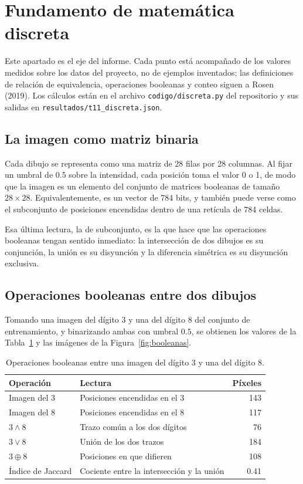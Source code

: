 \documentclass[12pt,letterpaper]{article}
\begin{document}
\section{Fundamento de matemática discreta}
\label{sec:discreta}

Este apartado es el eje del informe. Cada punto está acompañado de los valores
medidos sobre los datos del proyecto, no de ejemplos inventados; las definiciones
de relación de equivalencia, operaciones booleanas y conteo siguen a
Rosen (2019). Los cálculos están en el archivo \texttt{codigo/discreta.py} del
repositorio y sus salidas en \texttt{resultados/t11\_discreta.json}.

\subsection{La imagen como matriz binaria}

Cada dibujo se representa como una matriz de 28 filas por 28 columnas. Al fijar un
umbral de $0.5$ sobre la intensidad, cada posición toma el valor 0 o 1, de modo
que la imagen es un elemento del conjunto de matrices booleanas de tamaño
$28\times28$. Equivalentemente, es un vector de 784 bits, y también puede verse
como el subconjunto de posiciones encendidas dentro de una retícula de 784 celdas.

Esa última lectura, la de subconjunto, es la que hace que las operaciones
booleanas tengan sentido inmediato: la intersección de dos dibujos es su
conjunción, la unión es su disyunción y la diferencia simétrica es su disyunción
exclusiva.

\subsection{Operaciones booleanas entre dos dibujos}

Tomando una imagen del dígito 3 y una del dígito 8 del conjunto de entrenamiento,
y binarizando ambas con umbral $0.5$, se obtienen los valores de la
Tabla~\ref{tab:booleanas} y las imágenes de la Figura~\ref{fig:booleanas}.

\begin{table}[htbp]
\centering
\caption{Operaciones booleanas entre una imagen del dígito 3 y una del dígito 8.}
\label{tab:booleanas}
\begin{tabular}{llr}
\toprule
\textbf{Operación} & \textbf{Lectura} & \textbf{Píxeles} \\
\midrule
Imagen del 3 & Posiciones encendidas en el 3 & 143 \\
Imagen del 8 & Posiciones encendidas en el 8 & 117 \\
$3 \wedge 8$ & Trazo común a los dos dígitos & 76 \\
$3 \vee 8$ & Unión de los dos trazos & 184 \\
$3 \oplus 8$ & Posiciones en que difieren & 108 \\
Índice de Jaccard & Cociente entre la intersección y la unión & 0.41 \\
\bottomrule
\end{tabular}
\end{table}
\end{document}
